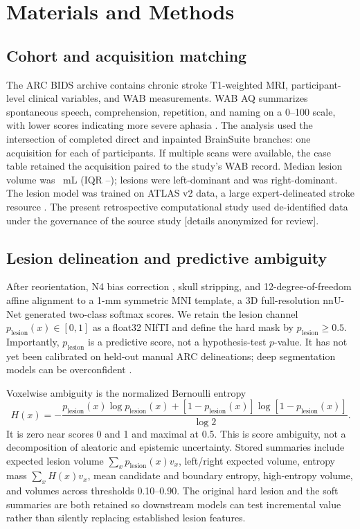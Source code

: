\documentclass[runningheads]{llncs}
\newcommand{\plesion}{p_{\mathrm{lesion}}}
\begin{document}
\section{Materials and Methods}

\subsection{Cohort and acquisition matching}
The ARC BIDS archive contains chronic stroke T1-weighted MRI, participant-level
clinical variables, and WAB measurements. WAB AQ summarizes spontaneous
speech, comprehension, repetition, and naming on a 0--100 scale, with lower
scores indicating more severe aphasia \cite{Kertesz1982}. The analysis used the
intersection of completed direct and inpainted BrainSuite branches: one
acquisition for each of \ArcNMatched{} participants. If multiple scans were
available, the case table retained the acquisition paired to the study's WAB
record. Median lesion volume was \ArcLesionMedian{}~mL (IQR
\ArcLesionQOne--\ArcLesionQThree); \ArcLeftDominant{} lesions were
left-dominant and \ArcRightDominant{} was right-dominant. The lesion model was
trained on ATLAS v2 data, a large expert-delineated stroke resource
\cite{Liew2022}. The present retrospective computational study used
de-identified data under the governance of the source study [details
anonymized for review].

\subsection{Lesion delineation and predictive ambiguity}
After reorientation, N4 bias correction \cite{Tustison2010}, skull stripping,
and 12-degree-of-freedom affine alignment to a 1-mm symmetric MNI template, a
3D full-resolution nnU-Net \cite{Isensee2021} generated two-class softmax
scores. We retain the lesion channel $\plesion(x)\in[0,1]$ as a float32 NIfTI
and define the hard mask by $\plesion\geq0.5$. Importantly,
$\plesion$ is a predictive score, not a hypothesis-test $p$-value. It has not
yet been calibrated on held-out manual ARC delineations; deep segmentation
models can be overconfident \cite{Guo2017,Mehrtash2020}.

Voxelwise ambiguity is the normalized Bernoulli entropy
\begin{equation}
 H(x)=-\frac{\plesion(x)\log \plesion(x)+
 [1-\plesion(x)]\log[1-\plesion(x)]}{\log 2}.
 \label{eq:entropy}
\end{equation}
It is zero near scores 0 and 1 and maximal at 0.5. This is score ambiguity, not
a decomposition of aleatoric and epistemic uncertainty. Stored summaries
include expected lesion volume $\sum_x\plesion(x)v_x$, left/right expected
volume, entropy mass $\sum_xH(x)v_x$, mean candidate and boundary entropy,
high-entropy volume, and volumes across thresholds 0.10--0.90. The original
hard lesion and the soft summaries are both retained so downstream models can
test incremental value rather than silently replacing established lesion
features.
\end{document}

